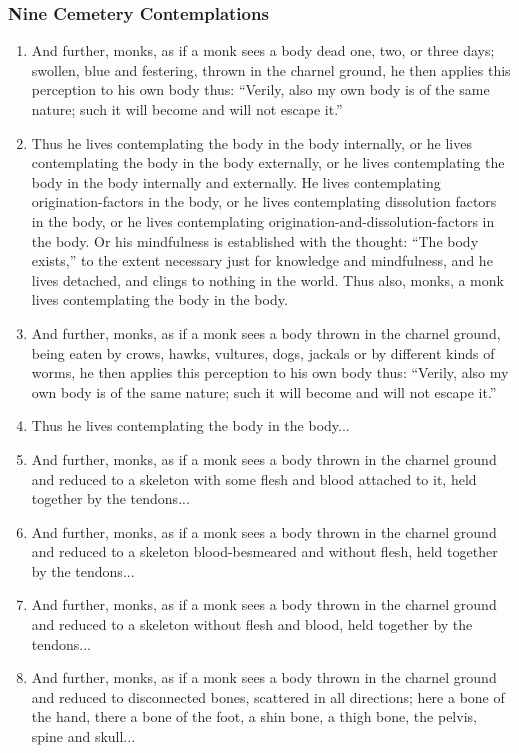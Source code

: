 \subsubsection*{Nine Cemetery Contemplations}
\begin{enumerate}[resume]
\item And further, monks, as if a monk sees a body dead one, two, or three days; swollen, blue and festering, thrown in the charnel ground, he then applies this perception to his own body thus: “Verily, also my own body is of the same nature; such it will become and will not escape it.”
\item Thus he lives contemplating the body in the body internally, or he lives contemplating the body in the body externally, or he lives contemplating the body in the body internally and externally. He lives contemplating origination-factors in the body, or he lives contemplating dissolution factors in the body, or he lives contemplating origination-and-dissolution-factors in the body. Or his mindfulness is established with the thought: “The body exists,” to the extent necessary just for knowledge and mindfulness, and he lives detached, and clings to nothing in the world. Thus also, monks, a monk lives contemplating the body in the body.
\item And further, monks, as if a monk sees a body thrown in the charnel ground, being eaten by crows, hawks, vultures, dogs, jackals or by different kinds of worms, he then applies this perception to his own body thus: “Verily, also my own body is of the same nature; such it will become and will not escape it.”
\item Thus he lives contemplating the body in the body...
\item And further, monks, as if a monk sees a body thrown in the charnel ground and reduced to a skeleton with some flesh and blood attached to it, held together by the tendons...
\item And further, monks, as if a monk sees a body thrown in the charnel ground and reduced to a skeleton blood-besmeared and without flesh, held together by the tendons...
\item And further, monks, as if a monk sees a body thrown in the charnel ground and reduced to a skeleton without flesh and blood, held together by the tendons...
\item And further, monks, as if a monk sees a body thrown in the charnel ground and reduced to disconnected bones, scattered in all directions; here a bone of the hand, there a bone of the foot, a shin bone, a thigh bone, the pelvis, spine and skull...

\end{enumerate}
